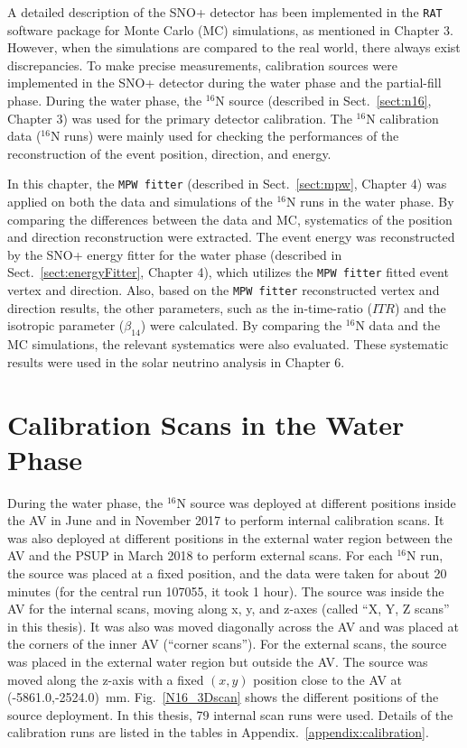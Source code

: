 A detailed description of the SNO+ detector has been implemented in the \texttt{RAT} software package for Monte Carlo (MC) simulations, as mentioned in Chapter 3. However, when the simulations are compared to the real world, there always exist discrepancies. To make precise measurements, calibration sources were implemented in the SNO+ detector during the water phase and the partial-fill phase. During the water phase, the $^{16}$N source (described in Sect.~\ref{sect:n16}, Chapter 3) was used for the primary detector calibration. The $^{16}$N calibration data ($^{16}$N runs) were mainly used for checking the performances of the reconstruction of the event position, direction, and energy. 

In this chapter, the \texttt{MPW fitter} (described in Sect.~\ref{sect:mpw}, Chapter 4) was applied on both the data and simulations of the $^{16}$N runs in the water phase. By comparing the differences between the data and MC, systematics of the position and direction reconstruction were extracted. The event energy was reconstructed by the SNO+ energy fitter for the water phase (described in Sect.~\ref{sect:energyFitter}, Chapter 4), which utilizes the \texttt{MPW fitter} fitted event vertex and direction. Also, based on the \texttt{MPW fitter} reconstructed vertex and direction results, the other parameters, such as the in-time-ratio ($ITR$) and the isotropic parameter ($\beta_{14}$) were calculated. By comparing the $^{16}$N data and the MC simulations, the relevant systematics were also evaluated. These systematic results were used in the solar neutrino analysis in Chapter 6.

\section{ Calibration Scans in the Water Phase}\label{sect:n16_water}
During the water phase, the $^{16}$N source was deployed at different positions inside the AV in June and in November 2017 to perform internal calibration scans. It was also deployed at different positions in the external water region between the AV and the PSUP in March 2018 to perform external scans. For each $^{16}$N run, the source was placed at a fixed position, and the data were taken for about 20 minutes (for the central run 107055, it took 1 hour). The source was inside the AV for the internal scans, moving along x, y, and z-axes (called ``X, Y, Z scans'' in this thesis). It was also was moved diagonally across the AV and was placed at the corners of the inner AV (``corner scans''). For the external scans, the source was placed in the external water region but outside the AV. The source was moved along the z-axis with a fixed $(x,y)$ position close to the AV at (-5861.0,-2524.0)~mm. Fig.~\ref{N16_3Dscan} shows the different positions of the source deployment. In this thesis, 79 internal scan runs were used. Details of the calibration runs are listed in the tables in Appendix.~\ref{appendix:calibration}. %


